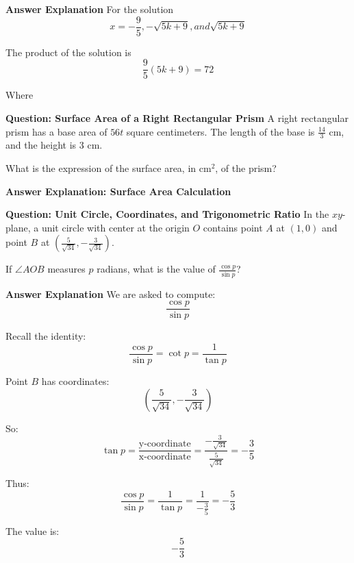 \documentclass{beamer}
\begin{document}
\begin{frame}{\textbf{Answer Explanation}}
\small
For the solution
\[x=-\frac{9}{5} , -\sqrt{5k+9}, and \sqrt{5k+9}\]

The product of the solution is 
\[\frac{9}{5}(5k+9)=72\]

Where 

\end{frame}

\begin{frame}{\textbf{Question: Surface Area of a Right Rectangular Prism}}
\small
A right rectangular prism has a base area of $56t$ square centimeters. The length of the base is $\frac{14}{3}$ cm, and the height is $3$ cm.

What is the expression of the surface area, in cm$^2$, of the prism?
\end{frame}

\begin{frame}{\textbf{Answer Explanation: Surface Area Calculation}}
\small
{}


\end{frame}

\begin{frame}{\textbf{Question: Unit Circle, Coordinates, and Trigonometric Ratio}}
\small
In the $xy$-plane, a unit circle with center at the origin $O$ contains point $A$ at $(1, 0)$ and point $B$ at $\left( \frac{5}{\sqrt{34}}, -\frac{3}{\sqrt{34}} \right)$.

If $\angle AOB$ measures $p$ radians, what is the value of $\frac{\cos p}{\sin p}$?
\end{frame}

\begin{frame}{\textbf{Answer Explanation}}
\small
We are asked to compute:
\[
\frac{\cos p}{\sin p}
\]

Recall the identity:
\[
\frac{\cos p}{\sin p} = \cot p = \frac{1}{\tan p}
\]

Point $B$ has coordinates:
\[
\left( \frac{5}{\sqrt{34}}, -\frac{3}{\sqrt{34}} \right)
\]

So:
\[
\tan p = \frac{\text{y-coordinate}}{\text{x-coordinate}} = \frac{-\frac{3}{\sqrt{34}}}{\frac{5}{\sqrt{34}}} = -\frac{3}{5}
\]

Thus:
\[
\frac{\cos p}{\sin p} = \frac{1}{\tan p} = \frac{1}{ -\frac{3}{5} } = -\frac{5}{3}
\]

The value is:
\[
\boxed{-\frac{5}{3}}
\]
\end{frame}
\end{document}
